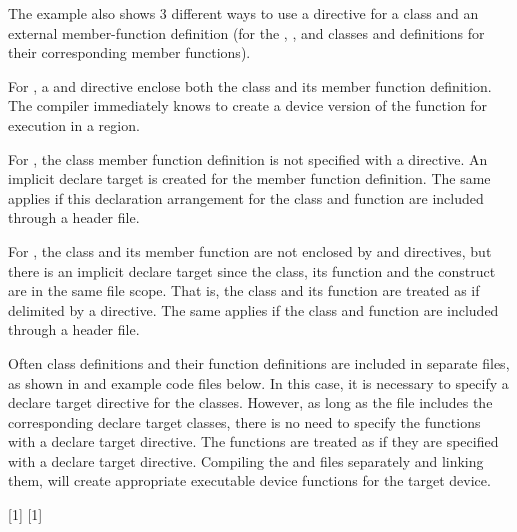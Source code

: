 \begin{cppspecific}

The example also shows 3 different ways to use a  directive for a
class and an external member-function definition (for the , , 
and  classes and definitions for their corresponding  member functions).

For , a  and
 directive
enclose both the class and its member function definition. The compiler immediately
knows to create a device version of the function for execution in a  region.

For , the class member function definition is not specified with a
 directive.
An implicit declare target is created for the member function definition.
The same applies if this declaration arrangement for the class and function 
are included through a header file.

For , the class and its member function are not enclosed by 
and  directives,
but there is an implicit declare target since the class, its function
and the  construct are in the same file scope. That is, the class
and its function are treated as if delimited by a  directive.
The same applies if the class and function are included through a header file.



Often class definitions and their function definitions are included in separate files,
as shown in  and  example code files below.
In this case, it is necessary to specify a declare target directive for the classes.
However, as long as the  file includes the corresponding declare target classes,
there is no need to specify the functions with a declare target directive.
The functions are treated as if they are specified with a declare target directive.
Compiling the  and  files 
separately and linking them, will create appropriate executable device functions for the target device.

\smallskip
{}[1]
\smallskip
{}[1]


\end{cppspecific}
